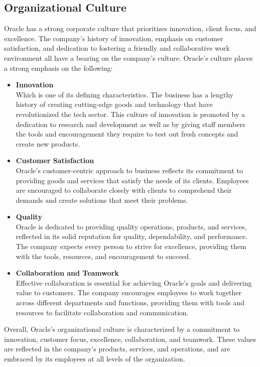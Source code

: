 \subsection{Organizational Culture}
Oracle has a strong corporate culture that prioritizes innovation, client focus, and excellence. The company's history of innovation, emphasis on customer satisfaction, and dedication to fostering a friendly and collaborative work environment all have a bearing on the company's culture.\mynewline
Oracle's culture places a strong emphasis on the following:
\begin{itemize}
    \item \textbf{Innovation }\\
          Which is one of its defining characteristics. The business has a lengthy history of creating cutting-edge goods and technology that have revolutionized the tech sector. This culture of innovation is promoted by a dedication to research and development as well as by giving staff members the tools and encouragement they require to test out fresh concepts and create new products.
    \item \textbf{Customer Satisfaction }\\
          Oracle's customer-centric approach to business reflects its commitment to providing goods and services that satisfy the needs of its clients. Employees are encouraged to collaborate closely with clients to comprehend their demands and create solutions that meet their problems.
    \item \textbf{Quality }\\
          Oracle is dedicated to providing quality operations, products, and services, reflected in its solid reputation for quality, dependability, and performance. The company expects every person to strive for excellence, providing them with the tools, resources, and encouragement to succeed.
    \item \textbf{Collaboration and Teamwork }\\
          Effective collaboration is essential for achieving Oracle's goals and delivering value to customers. The company encourages employees to work together across different departments and functions, providing them with tools and resources to facilitate collaboration and communication.
\end{itemize}

Overall, Oracle's organizational culture is characterized by a commitment to innovation, customer focus, excellence, collaboration, and teamwork. These values are reflected in the company's products, services, and operations, and are embraced by its employees at all levels of the organization.


